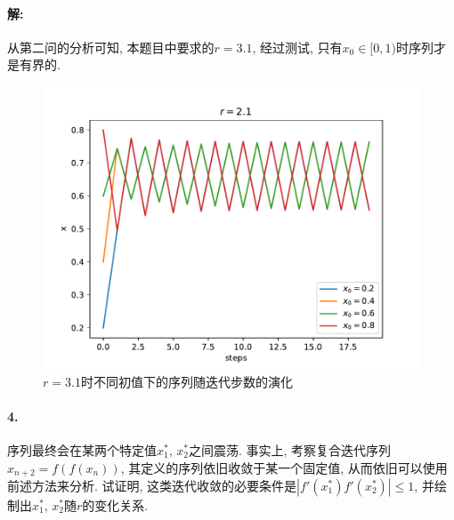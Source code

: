 \documentclass[a4paper,zihao=5,UTF8]{ctexart}
\begin{document}
    \paragraph{解: }
    从第二问的分析可知, 本题目中要求的$r = 3.1$, 经过测试, 只有$x_0\in[0, 1)$时序列才是有界的. 
    \begin{figure}[htbp]
        \centering
        \includegraphics[scale=0.6]{3.pdf}
        \caption{$r=3.1$时不同初值下的序列随迭代步数的演化}
    \end{figure}

    \paragraph{4.}
    序列最终会在某两个特定值$x_1^*,\,x_2^*$之间震荡. 事实上, 考察复合迭代序列$x_{n+2} = f(f(x_n))$, 
    其定义的序列依旧收敛于某一个固定值, 从而依旧可以使用前述方法来分析. 试证明, 
    这类迭代收敛的必要条件是$|f'(x_1^*)f'(x_2^*)| \leq 1$, 并绘制出$x_1^*,\,x_2^*$随$r$的变化关系.
\end{document}
